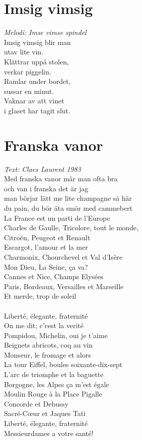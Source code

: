 \section{Imsig vimsig}
\textit{Melodi: Imse vimse spindel}
\vspace{2mm}\\
Imsig vimsig blir man\\
utav lite vin.\\
Klättrar uppå stolen,\\
verkar piggelin.\\
Ramlar under bordet,\\
sussar en minut.\\
Vaknar av att vinet\\
i glaset har tagit slut.

\section{Franska vanor}
\textit{Text: Claes Laurent 1983}
\vspace{2mm}\\
Med franska vanor mår man ofta bra\\
och van i franska det är jag\\
man börjar lätt me lite champagne så här\\
du pain, du bör äta smör med cammebert\\
La France est un parti de l'Europe\\
Charles de Gaulle, Tricolore, tout le monde,\\
Citroën, Peugeot et Renault\\
Escargot, l'amour et la mer\\
Charmonix, Chourchevel et Val d'Isère\\
Mon Dieu, La Seine, ça va?\\
Cannes et Nice, Champs Elysées\\
Paris, Bordeaux, Versailles et Marseille\\
Et merde, trop de soleil\\
\\
Liberté, élegante, fraternité\\
On me dit; c'cest la verité\\
Pompidou, Michelin, oui je t'aime\\
Beignets abricots, coq au vin\\
Monseur, le fromage et alors\\
La tour Eiffel, boules soixante-dix-sept\\
L'arc de triomphe et la baguette\\
Borgogne, les Alpes ça m'est égale\\
Moulin Rouge à la Place Pigalle\\
Concorde et Debussy\\
Sacré-C\oe{}ur et Jaques Tati\\
Liberté, élegante, fraternité\\
Messieurdames a votre santé!

